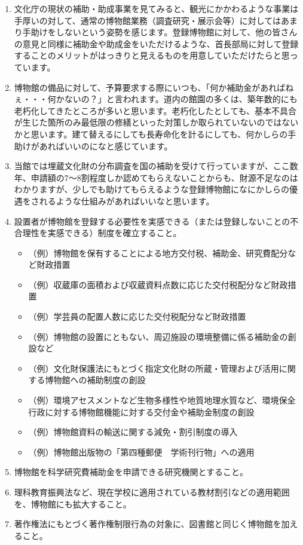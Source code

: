 \documentclass[12pt]{jsarticle}
\begin{document}
\begin{enumerate}
	\item 文化庁の現状の補助・助成事業を見てみると、観光にかかわるような事業は手厚いの対して、通常の博物館業務（調査研究・展示会等）に対してはあまり手助けをしないという姿勢を感じます。登録博物館に対して、他の皆さんの意見と同様に補助金や助成金をいただけるような、首長部局に対して登録することのメリットがはっきりと見えるものを用意していただけたらと思っています。
	\item 博物館の備品に対して、予算要求する際にいつも、「何か補助金があればねぇ・・・何かないの？」と言われます。道内の館園の多くは、築年数的にも老朽化してきたところが多いと思います。老朽化したとしても、基本不具合が生じた箇所のみ最低限の修繕といった対策しか取られていないのではないかと思います。建て替えるにしても長寿命化を計るにしても、何かしらの手助けがあればいいのになと感じています。
	\item 当館では埋蔵文化財の分布調査を国の補助を受けて行っていますが、ここ数年、申請額の7〜8割程度しか認めてもらえないことからも、財源不足なのはわかりますが、少しでも助けてもらえるような登録博物館になにかしらの優遇をされるような仕組みがあればいいなと思います。
	\item 設置者が博物館を登録する必要性を実感できる（または登録しないことの不合理性を実感できる）制度を確立すること。
		\begin{itemize}
		\item （例）博物館を保有することによる地方交付税、補助金、研究費配分など財政措置
		\item （例）収蔵庫の面積および収蔵資料点数に応じた交付税配分など財政措置
		\item （例）学芸員の配置人数に応じた交付税配分など財政措置
		\item （例）博物館の設置にともない、周辺施設の環境整備に係る補助金の創設など
		\item （例）文化財保護法にもとづく指定文化財の所蔵・管理および活用に関する博物館への補助制度の創設
		\item （例）環境アセスメントなど生物多様性や地質地理水質など、環境保全行政に対する博物館機能に対する交付金や補助金制度の創設
		\item （例）博物館資料の輸送に関する減免・割引制度の導入
		\item （例）博物館出版物の「第四種郵便　学術刊行物」への適用
	\end{itemize}
	\item 博物館を科学研究費補助金を申請できる研究機関とすること。
	\item 理科教育振興法など、現在学校に適用されている教材割引などの適用範囲を、博物館にも拡大すること。
	\item 著作権法にもとづく著作権制限行為の対象に、図書館と同じく博物館を加えること。
	
\end{enumerate}
\end{document}
